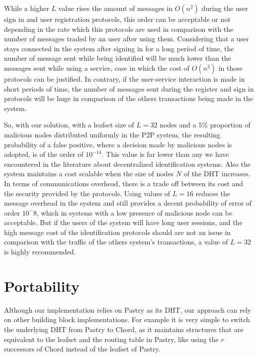 While a higher $L$ value rises the amount of messages in $O(n^2)$ during the
user sign in and user registration protocols, this order can be acceptable
or not depending in the rate which this protocols are used in comparison with
the number of messages traded by an user after using them. Considering that a
user stays connected in the system after signing in  for a long period of time, the
number of message sent while being identified will be much lower than the messages
sent while using a service, case in which the cost of $O(n^2)$ in those
protocols can be justified. In contrary, if the user-service interaction
is made in short periods of time, the number of messages sent during the register and
sign in protocols will be huge in comparison of the others transactions being
made in the system. 

So, with our solution, with a leafset size of $L = 32$ nodes and a
$5\%$ proportion of malicious nodes distributed uniformly in the P2P system, the resulting probability of a false
positive, where a decision made by malicious nodes is adopted, is of the order
of $10^{-14}$. 
This value is far lower than any we have encountered in the
literature about decentralized identification systems. Also the system
maintains a cost scalable when the size of nodes $N$ of the DHT
increases. In terms of communications overhead, there is a trade off between its
cost and the security provided by the protocols. Using values of
$L = 16$ reduces the message overhead in the system and still provides a decent
probability of error of order $10^-8$, which in systems with a low presence of
malicious node can be acceptable. But if the users of the system
will have long user sessions, and the high message cost of the identification
protocols should are not an issue in comparison with the traffic of the others
system's transactions, a value of $L = 32$ is highly recommended. 


\section{Portability}

Although our implementation relies on Pastry as its DHT, our approach can rely
on other building block implementations. For example it is very simple to
switch the underlying DHT from Pastry to Chord, as it maintains structures
that are equivalent to the leafset and the routing table in Pastry, like using
the $r$ successors of Chord instead of the leafset of Pastry.

